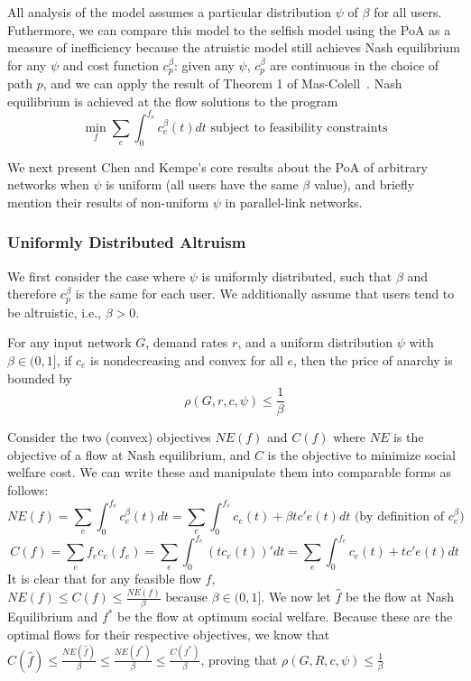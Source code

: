 All analysis of the model assumes a particular distribution $\psi$ of $\beta$ for all users. 
Futhermore, we can compare this model to the selfish model using the PoA as a measure of inefficiency
because the atruistic model still achieves Nash equilibrium for any $\psi$ and cost function $c^\beta_p$: given any $\psi$, $c^\beta_p$ are continuous in the choice of path $p$, and we can apply the result of Theorem 1 of Mas-Colell~\cite{mascolell}. Nash equilibrium is achieved at the flow solutions to the program
$$\min_f\sum_e\int_0^{f_e}c_e^\beta(t)dt \text{ subject to feasibility constraints}$$

We next present Chen and Kempe's core results about the PoA of arbitrary networks when $\psi$ is uniform (all users have the same $\beta$ value), and briefly mention their results of non-uniform $\psi$ in parallel-link networks.

\subsubsection{Uniformly Distributed Altruism}
We first consider the case where $\psi$ is uniformly distributed, such that $\beta$ and therefore $c^\beta_p$ is the same for each user. We additionally assume that users tend to be altruistic, i.e., $\beta > 0$.
\begin{theorem}
For any input network $G$, demand rates $r$, and 
a uniform distribution $\psi$ with $\beta \in (0, 1]$,
if $c_e$ is nondecreasing and convex for all $e$,
    then the price of anarchy is bounded by 
    $$\rho(G,r,c,\psi) \le \frac{1}{\beta}$$
\end{theorem}

\begin{proof-sketch}
    Consider the two (convex) objectives $NE(f)$ and $C(f)$ where $NE$ is the objective of a flow at Nash equilibrium, and $C$ is the objective to minimize social welfare cost. We can write these and manipulate them into comparable forms as follows:
    $$NE({f}) = \sum_e\int_0^{{f}_e}c_e^\beta(t)dt = 
        \sum_e\int_0^{{f}_e} c_e(t) + \beta tc'e(t)dt\text{ (by definition of $c^\beta_e$)}$$
    $$C(f) = \sum_ef_ec_e(f_e) = \sum_e\int_0^{f_e} (tc_e(t))' dt 
        = \sum_e\int_0^{f_e} c_e(t) + tc'e(t)dt$$ 
    It is clear that for any feasible flow $f$, 
    $NE(f) \le C(f) \le \frac{NE(f)}{\beta} \text{ because $\beta\in(0,1]$}$.
    We now let $\hat{f}$ be the flow at Nash Equilibrium and $f^*$ be the flow at optimum social welfare. Because these are the optimal flows for their respective objectives, we know that 
    $C(\hat{f}) \le \frac{NE(\hat{f})}{\beta} \le \frac{NE(f^*)}{\beta} \le \frac{C(f^*)}{\beta}$,
    proving that 
    $\rho(G,R,c,\psi) \le \frac{1}{\beta}$
\end{proof-sketch}

